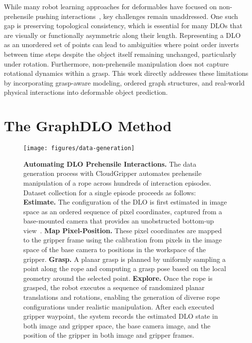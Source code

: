 \documentclass[letterpaper, 10 pt, conference]{IEEETran}
\begin{document}
While many robot learning approaches for deformables have focused on non-prehensile pushing interactions~\cite{wang2023pile, zahid2024cloudgripper, zhang2024adaptigraph, zhang2024dynamic3dgs}, key challenges remain unaddressed. One such gap is preserving topological consistency, which is essential for many DLOs that are visually or functionally asymmetric along their length. Representing a DLO as an unordered set of points can lead to ambiguities where point order inverts between time steps despite the object itself remaining unchanged, particularly under rotation. Furthermore, non-prehensile manipulation does not capture rotational dynamics within a grasp. This work directly addresses these limitations by incorporating grasp-aware modeling, ordered graph structures, and real-world physical interactions into deformable object prediction.

\section{The GraphDLO Method}

\begin{figure*}
\centering
\texttt{[image: figures/data-generation]}
\caption{\textbf{Automating DLO Prehensile Interactions.} The data generation process with CloudGripper automates prehensile manipulation of a rope across hundreds of interaction episodes. Dataset collection for a single episode proceeds as follows: \textbf{Estimate.} The configuration of the DLO is first estimated in image space as an ordered sequence of pixel coordinates, captured from a base-mounted camera that provides an unobstructed bottom-up view~\cite{keipour2022efficient, xiang2023trackdlo}. \textbf{Map Pixel-Position.} These pixel coordinates are mapped to the gripper frame using the calibration from pixels in the image space of the base camera to positions in the workspace of the gripper. \textbf{Grasp.} A planar grasp is planned by uniformly sampling a point along the rope and computing a grasp pose based on the local geometry around the selected point. \textbf{Explore.} Once the rope is grasped, the robot executes a sequence of randomized planar translations and rotations, enabling the generation of diverse rope configurations under realistic manipulation. After each executed gripper waypoint, the system records the estimated DLO state in both image and gripper space, the base camera image, and the position of the gripper in both image and gripper frames.\vspace{-2em}}
\label{fig: data-generation}
\end{figure*}
\end{document}
